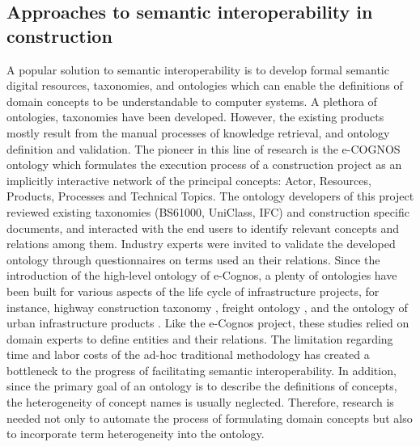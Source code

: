 \documentclass[Journal,InsideFigs, DoubleSpace]{ascelike} %
\begin{document}
\subsection{Approaches to semantic interoperability in construction}
A popular solution to semantic interoperability is to develop formal semantic digital resources, taxonomies, and ontologies which can enable the definitions of domain concepts to be understandable to computer systems. A plethora of ontologies, taxonomies have been developed. However, the existing products mostly result from the manual processes of knowledge retrieval, and ontology definition and validation. The pioneer in this line of research is the e-COGNOS ontology \cite{wetherill02,lima05} which formulates the execution process of a construction project as an implicitly interactive network of the principal concepts: Actor, Resources, Products, Processes and Technical Topics. The ontology developers of this project reviewed existing taxonomies (BS61000, UniClass, IFC) and construction specific documents, and interacted with the end users to identify relevant concepts and relations among them. Industry experts were invited to validate the developed ontology through questionnaires on terms used an their relations. Since the introduction of the high-level ontology of e-Cognos, a plenty of ontologies have been built for various aspects of the life cycle of infrastructure projects, for instance, highway construction taxonomy \cite{el-diraby05,el-diraby05b}, freight ontology \cite{seedah15}, and the ontology of urban infrastructure products \cite{osman06}. Like the e-Cognos project, these studies relied on domain experts to define entities and their relations. The limitation regarding time and labor costs of the ad-hoc traditional methodology has created a bottleneck to the progress of facilitating semantic interoperability. In addition, since the primary goal of an ontology is to describe the definitions of concepts, the heterogeneity of concept names is usually neglected. Therefore, research is needed not only to automate the process of formulating domain concepts but also to incorporate term heterogeneity into the ontology.
\par
\end{document}
